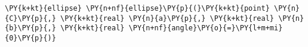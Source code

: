 \begin{Verbatim}[commandchars=\\\{\}]
    \PY{k+kt}{ellipse} \PY{n+nf}{ellipse}\PY{p}{(}\PY{k+kt}{point} \PY{n}{C}\PY{p}{,} \PY{k+kt}{real} \PY{n}{a}\PY{p}{,} \PY{k+kt}{real} \PY{n}{b}\PY{p}{,} \PY{k+kt}{real} \PY{n+nf}{angle}\PY{o}{=}\PY{l+m+mi}{0}\PY{p}{)}
\end{Verbatim}
